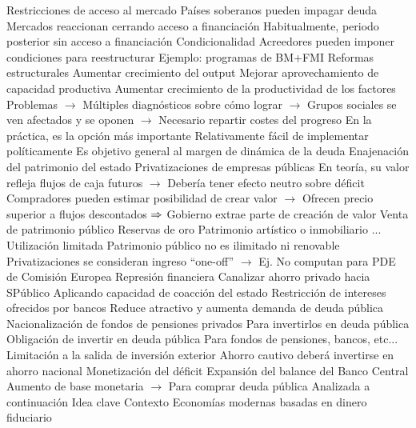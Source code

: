 \documentclass{nuevotema}
\begin{document}
\begin{esquemal}
				\4 Restricciones de acceso al mercado
				\4[] Países soberanos pueden impagar deuda
				\4[] Mercados reaccionan cerrando acceso a financiación
				\4[] Habitualmente, periodo posterior sin acceso a financiación
				\4 Condicionalidad
				\4[] Acreedores pueden imponer condiciones para reestructurar
				\4[] Ejemplo: programas de BM+FMI
			\3 Reformas estructurales
				\4 Aumentar crecimiento del output
				\4 Mejorar aprovechamiento de capacidad productiva
				\4 Aumentar crecimiento de la productividad de los factores
				\4 Problemas
				\4[] $\to$ Múltiples diagnósticos sobre cómo lograr
				\4[] $\to$ Grupos sociales se ven afectados y se oponen
				\4[] $\to$ Necesario repartir costes del progreso
				\4 En la práctica, es la opción más importante
				\4[] Relativamente fácil de implementar políticamente
				\4[] Es objetivo general al margen de dinámica de la deuda
			\3 Enajenación del patrimonio del estado
				\4 Privatizaciones de empresas públicas
				\4[] En teoría, su valor refleja flujos de caja futuros
				\4[] $\to$ Debería tener efecto neutro sobre déficit
				\4[] Compradores pueden estimar posibilidad de crear valor
				\4[] $\to$ Ofrecen precio superior a flujos descontados
				\4[] $\Rightarrow$ Gobierno extrae parte de creación de valor
				\4 Venta de patrimonio público
				\4[] Reservas de oro
				\4[] Patrimonio artístico o inmobiliario
				\4[] ...
				\4 Utilización limitada
				\4[] Patrimonio público no es ilimitado ni renovable
				\4[] Privatizaciones se consideran ingreso ``one-off''
				\4[] $\to$ Ej. No computan para PDE  de Comisión Europea
			\3 Represión financiera
				\4 Canalizar ahorro privado hacia SPúblico
				\4[] Aplicando capacidad de coacción del estado
				\4 Restricción de intereses ofrecidos por bancos
				\4[] Reduce atractivo y aumenta demanda de deuda pública
				\4 Nacionalización de fondos de pensiones privados
				\4[] Para invertirlos en deuda pública
				\4 Obligación de invertir en deuda pública
				\4[] Para fondos de pensiones, bancos, etc...
				\4 Limitación a la salida de inversión exterior
				\4[] Ahorro cautivo deberá invertirse en ahorro nacional
			\3 Monetización del déficit
				\4 Expansión del balance del Banco Central
				\4[] Aumento de base monetaria
				\4[] $\to$ Para comprar deuda pública
				\4 Analizada a continuación
	\1 
		\2 Idea clave
			\3 Contexto
				\4 Economías modernas basadas en dinero fiduciario

\end{esquemal}
\end{document}
